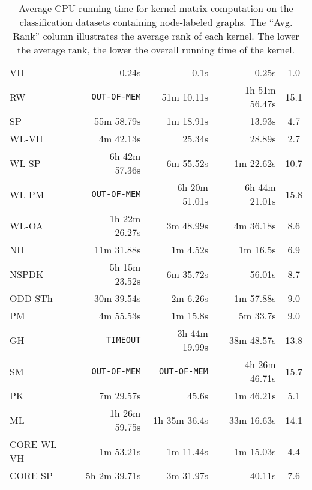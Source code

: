 \documentclass[twoside,11pt]{article}
\begin{document}
\begin{table}[t]
\begin{tabular}{lrrrm{1.48cm}}
& & & & \\
\midrule
VH & 0.24s & 0.1s & 0.25s & \multicolumn{1}{c}{1.0} \\ 
RW & \texttt{OUT-OF-MEM} & 51m 10.11s & 1h 51m 56.47s & \multicolumn{1}{c}{15.1} \\ 
SP & 55m 58.79s & 1m 18.91s & 13.93s & \multicolumn{1}{c}{4.7} \\ 
WL-VH & 4m 42.13s & 25.34s & 28.89s & \multicolumn{1}{c}{2.7} \\ 
WL-SP & 6h 42m 57.36s & 6m 55.52s & 1m 22.62s & \multicolumn{1}{c}{10.7} \\ 
WL-PM & \texttt{OUT-OF-MEM} & 6h 20m 51.01s & 6h 44m 21.01s & \multicolumn{1}{c}{15.8} \\ 
WL-OA & 1h 22m 26.27s & 3m 48.99s & 4m 36.18s & \multicolumn{1}{c}{8.6} \\ 
NH & 11m 31.88s & 1m 4.52s & 1m 16.5s & \multicolumn{1}{c}{6.9} \\ 
NSPDK & 5h 15m 23.52s & 6m 35.72s & 56.01s & \multicolumn{1}{c}{8.7} \\ 
ODD-STh & 30m 39.54s & 2m 6.26s & 1m 57.88s & \multicolumn{1}{c}{9.0} \\ 
PM & 4m 55.53s & 1m 15.8s & 5m 33.7s & \multicolumn{1}{c}{9.0} \\ 
GH & \texttt{TIMEOUT} & 3h 44m 19.99s & 38m 48.57s & \multicolumn{1}{c}{13.8} \\ 
SM & \texttt{OUT-OF-MEM} & \texttt{OUT-OF-MEM} & 4h 26m 46.71s & \multicolumn{1}{c}{15.7} \\ 
PK & 7m 29.57s & 45.6s & 1m 46.21s & \multicolumn{1}{c}{5.1} \\ 
ML & 1h 26m 59.75s & 1h 35m 36.4s & 33m 16.63s & \multicolumn{1}{c}{14.1} \\ 
CORE-WL-VH & 1m 53.21s & 1m 11.44s & 1m 15.03s & \multicolumn{1}{c}{4.4} \\ 
CORE-SP & 5h 2m 39.71s & 3m 31.97s & 40.11s & \multicolumn{1}{c}{7.6} \\ 
\bottomrule
\end{tabular}
\caption{Average CPU running time for kernel matrix computation on the  classification datasets containing node-labeled graphs. The ``Avg. Rank'' column illustrates the average rank of each kernel. The lower the average rank, the lower the overall running time of the kernel.}
\label{tab:runtimes_labeled}
\end{table}
\end{document}
